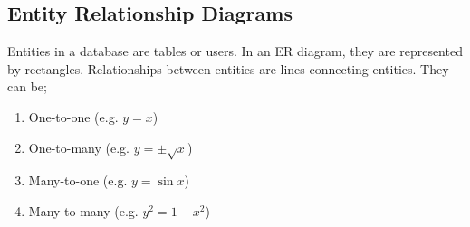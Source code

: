 \documentclass{article}
\begin{document}
\subsection{Entity Relationship Diagrams}

Entities in a database are tables or users. In an ER diagram, they are
represented by rectangles. Relationships between entities are lines connecting
entities. They can be;\begin{enumerate}

    \item One-to-one (e.g. $y=x$)
    
    \item One-to-many (e.g. $y=\pm\sqrt x$)
    
    \item Many-to-one (e.g. $y=\sin x$)
    
    \item Many-to-many (e.g. $y^2=1-x^2$)

\end{enumerate}
\end{document}

